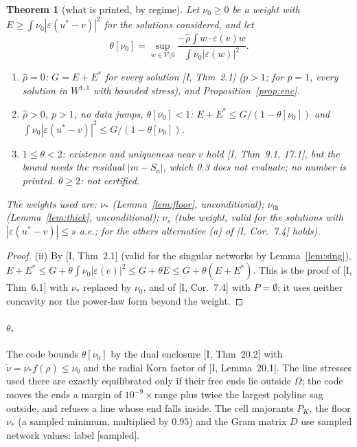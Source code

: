 \documentclass[11pt]{article}
\newtheorem{theorem}{Theorem}[section]
\theoremstyle{definition}
\newcommand{\eps}{\varepsilon}
\begin{document}
\begin{theorem}[what is printed, by regime]\label{thm:regimes}
Let $\nu_0\ge0$ be a weight with $E\ge\int\nu_0|\eps(u^*-v)|^2$ for the solutions considered, and let
\[
\theta[\nu_0]=\sup_{w\in V\setminus0}\frac{-\hat\rho\int w\cdot\eps(v)w}{\int\nu_0|\eps(w)|^2}.
\]
\begin{enumerate}[label=(\roman*)]
\item $\hat\rho=0$: $G=E+E^*$ for every solution [I, Thm~2.1] ($p>1$; for $p=1$, every solution in $W^{1,1}$ with
bounded stress), and Proposition~\ref{prop:enc}.
\item $\hat\rho>0$, $p>1$, no data jumps, $\theta[\nu_0]<1$: $E+E^*\le G/(1-\theta[\nu_0])$ and
$\int\nu_0|\eps(u^*-v)|^2\le G/(1-\theta[\nu_0])$.
\item $1\le\theta<2$: existence and uniqueness near $v$ hold [I, Thm~9.1, 17.1], but the bound needs the residual
$|m-S_a|$, which 0.3 does not evaluate; no number is printed. $\theta\ge2$: not certified.
\end{enumerate}
The weights used are: $\nu_*$ (Lemma~\ref{lem:floor}, unconditional); $\nu_{\mathrm{th}}$ (Lemma~\ref{lem:thick},
unconditional); $\nu_s$ (tube weight, valid for the solutions with $|\eps(u^*-v)|\le s$ a.e.; for the others
alternative (a) of [I, Cor.~7.4] holds).
\end{theorem}
\begin{proof}
(ii) By [I, Thm~2.1] (valid for the singular networks by Lemma~\ref{lem:sing}),
$E+E^*\le G+\theta\int\nu_0|\eps(e)|^2\le G+\theta E\le G+\theta(E+E^*)$. This is the proof of [I, Thm~6.1] with
$\nu_*$ replaced by $\nu_0$, and of [I, Cor.~7.4] with $P=\emptyset$; it uses neither concavity nor the power-law
form beyond the weight.
\end{proof}

\paragraph{$\theta$.} The code bounds $\theta[\nu_0]$ by the dual enclosure [I, Thm~20.2] with
$\tilde\nu=\nu_*f(\rho)\le\nu_0$ and the radial Korn factor of [I, Lemma~20.1]. The line stresses used there are
exactly equilibrated only if their free ends lie outside $\Omega$; the code moves the ends a margin of
$10^{-9}\times$range plus twice the largest polyline sag outside, and refuses a line whose end falls inside. The cell
majorants $P_K$, the floor $\nu_*$ (a sampled minimum, multiplied by $0.95$) and the Gram matrix $D$ use sampled
network values: label [sampled].
\end{document}
